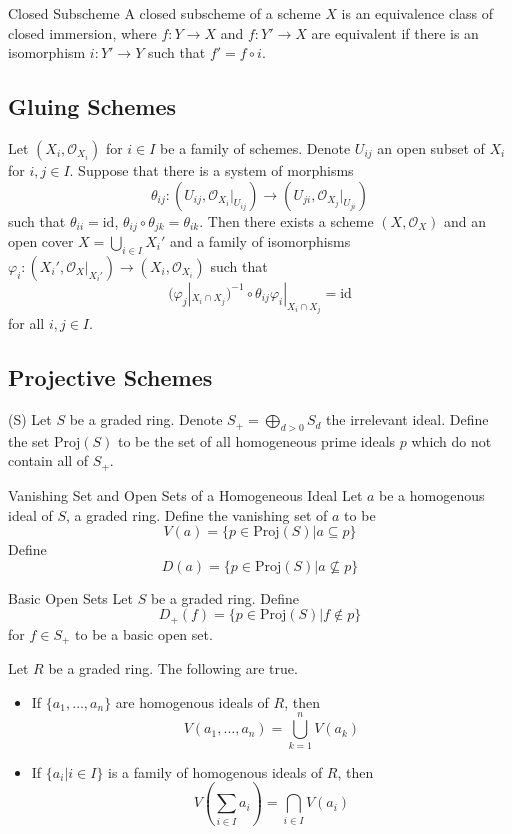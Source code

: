 \documentclass[a4paper]{article}
\begin{document}
\begin{defn}{Closed Subscheme}{} A closed subscheme of a scheme $X$ is an equivalence class of closed immersion, where $f:Y\to X$ and $f:Y'\to X$ are equivalent if there is an isomorphism $i:Y'\to Y$ such that $f'=f\circ i$. 
\end{defn}

\subsection{Gluing Schemes}
\begin{prp}{}{} Let $(X_i,\mathcal{O}_{X_i})$ for $i\in I$ be a family of schemes. Denote $U_{ij}$ an open subset of $X_i$ for $i,j\in I$. Suppose that there is a system of morphisms $$\theta_{ij}:(U_{ij},\mathcal{O}_{X_i}|_{U_{ij}})\to(U_{ji},\mathcal{O}_{X_j}|_{U_{ji}})$$ such that $\theta_{ii}=\text{id}$, $\theta_{ij}\circ\theta_{jk}=\theta_{ik}$. Then there exists a scheme $(X,\mathcal{O}_X)$ and an open cover $X=\bigcup_{i\in I}X_i'$ and a family of isomorphisms $\varphi_i:(X_i',\mathcal{O}_X|_{X_i'})\to(X_i,\mathcal{O}_{X_i})$ such that $$(\varphi_j|_{X_i\cap X_j})^{-1}\circ\theta_{ij}\varphi_i|_{X_i\cap X_j}=\text{id}$$ for all $i,j\in I$. 
\end{prp}

\subsection{Projective Schemes}
\begin{defn}{(S)}{} Let $S$ be a graded ring. Denote $S_+=\bigoplus_{d>0}S_d$ the irrelevant ideal. Define the set $\text{Proj}(S)$ to be the set of all homogeneous prime ideals $p$ which do not contain all of $S_+$. 
\end{defn}

\begin{defn}{Vanishing Set and Open Sets of a Homogeneous Ideal}{} Let $a$ be a homogenous ideal of $S$, a graded ring. Define the vanishing set of $a$ to be $$V(a)=\{p\in\text{Proj}(S)|a\subseteq p\}$$ Define $$D(a)=\{p\in\text{Proj}(S)|a\not\subseteq p\}$$
\end{defn}

\begin{defn}{Basic Open Sets}{} Let $S$ be a graded ring. Define $$D_+(f)=\{p\in\text{Proj}(S)|f\notin p\}$$ for $f\in S_+$ to be a basic open set. 
\end{defn}

\begin{prp}{}{} Let $R$ be a graded ring. The following are true. 
\begin{itemize}
\item If $\{a_1,\dots,a_n\}$ are homogenous ideals of $R$, then $$V(a_1,\dots,a_n)=\bigcup_{k=1}^nV(a_k)$$
\item If $\{a_i|i\in I\}$ is a family of homogenous ideals of $R$, then $$V\left(\sum_{i\in I}a_i\right)=\bigcap_{i\in I}V(a_i)$$
\end{itemize}
\end{prp}
\end{document}
